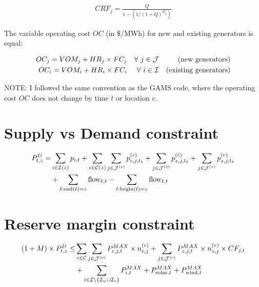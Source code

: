 \documentclass[11pt, oneside]{article}   	%
\newcommand{\flow}{\text{flow}}
\newcommand{\bc}{\bar{c}}
\begin{document}
\begin{equation} \label{eq:cap_rec}
\begin{aligned}
CRF_j = \frac{Q}{1-\left(1/(1+Q)^{D_j}\right)}
\end{aligned}
\end{equation}

The variable operating cost $OC$ (in \$/MWh) for new and existing generators is equal:

\begin{align} \label{eq:oc}
OC_{j} = VOM_{j} + HR_{j} \times FC_{j}  &&  \forall~j \in \mathcal{J} && \text{(new generators)}\\
OC_{i} = VOM_{i} + HR_{i} \times FC_{i}  && \forall~i \in \mathcal{I} && \text{(existing generators)}
\end{align}

NOTE: I followed the same convention as the GAMS code, where the operating cost $OC$ does not change by time $t$ or location $c$.

\section{Supply vs Demand constraint}

\begin{equation} \label{eq:supply_demand}
\begin{split}
P^D_{t, z} = & \sum_{i \in \Ic(z)} p_{i, t} +  \sum_{c \in \Cc (z)}  \sum_{j \in \Jc^{(c)}} p^{(c)}_{c, j, t_b} + \sum_{j \in \Jc^{(\bc)}} p^{(\bc)}_{z, j, t_b} +  \sum_{j \in \Jc^{(r)}} p^{(r)}_{z, j, t_b} \\
& +  \sum_{\ell: \text{end}(\ell) = z} \flow_{\ell, t} - \sum_{\ell: \text{begin}(\ell) = z} \flow_{\ell, t}
\end{split}
\end{equation}

\section{Reserve margin constraint}

\begin{equation} \label{eq:reserve}
\begin{split}
(1+M)\times P^D_{t, z} \le & \sum_{c \in \mathcal{C}} \sum_{j \in \mathcal{J}^{(c)}} P^{MAX}_{c, j, t} \times n^{(c)}_{c, j} +   \sum_{j \in \mathcal{J}^{(r)}} P^{MAX}_{z, j, t} \times n^{(r)}_{z, j}\times CF_{j, t} \\
& + \sum_{i \in \mathcal{I} \setminus \{\mathcal{I}_w \cup \mathcal{I}_s \}} P^{MAX}_{i, t} + P^{MAX}_{\text{solar}, t} + P^{MAX}_{\text{wind}, t}
\end{split}
\end{equation}
\end{document}
